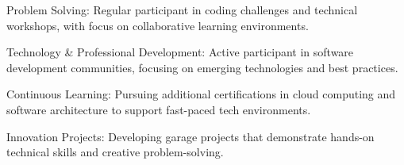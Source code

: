\documentclass[11pt, a4paper]{awesome-cv}
\begin{document}
\begin{cvskills}
\end{cvskills}

\begin{cvhonors}
\end{cvhonors}

\begin{cvitems}
  \item {Problem Solving: Regular participant in coding challenges and technical workshops, with focus on collaborative learning environments.}
  \item {Technology \& Professional Development: Active participant in software development communities, focusing on emerging technologies and best practices.}
  \item {Continuous Learning: Pursuing additional certifications in cloud computing and software architecture to support fast-paced tech environments.}
  \item {Innovation Projects: Developing garage projects that demonstrate hands-on technical skills and creative problem-solving.}
\end{cvitems}
\end{document}
